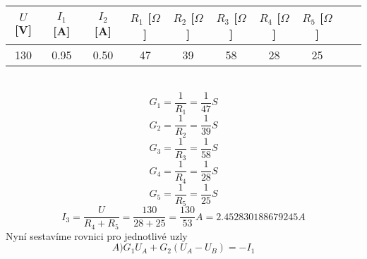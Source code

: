 \documentclass{article}
\begin{document}
\begin{tabular}{| c | c | c | c | c | c | c | c | c | c |}
  \hline
   $U$[V] & $I_1$ [A] & $I_2$ [A]& $R_{1}$ [$\Omega$]& $R_{2}$ [$\Omega$]& $R_{3}$ [$\Omega$]& $R_{4}$ [$\Omega$]& $R_{5}$ [$\Omega$]\\
  \hline
130 & 0.95 & 0.50 & 47 & 39 & 58 & 28 & 25\\
  \hline
\end{tabular}\\
\[
  G_1 = \displaystyle\frac{1}{R_1}
  = \displaystyle\frac{1}{47}S
\]
\[
  G_2 = \displaystyle\frac{1}{R_2}
  = \displaystyle\frac{1}{39}S
\]
\[
  G_3 = \displaystyle\frac{1}{R_3}
  = \displaystyle\frac{1}{58}S
\]
\[
  G_4 = \displaystyle\frac{1}{R_4}
  = \displaystyle\frac{1}{28}S
\]
\[
  G_5 = \displaystyle\frac{1}{R_5}
  = \displaystyle\frac{1}{25}S
\]
\[
  I_3 = \displaystyle\frac{U}{R_4 + R_5}
  = \displaystyle\frac{130}{28 + 25}
  = \displaystyle\frac{130}{53}A
  = 2.452830188679245A
\]
 Nyní sestavíme rovnici pro jednotlivé uzly
 \[
   A)G_1 U_A + G_2 (U_A - U_B ) = -I_1
 \]
\end{document}
